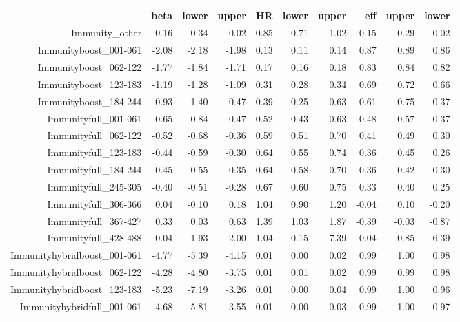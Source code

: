 \begin{table}[ht]
\centering
\begin{tabular}{rrrrrrrrrr}
  \hline
 & beta & lower & upper & HR & lower & upper & eff & upper & lower \\ 
  \hline
Immunity\_other & -0.16 & -0.34 & 0.02 & 0.85 & 0.71 & 1.02 & 0.15 & 0.29 & -0.02 \\ 
  Immunityboost\_001-061 & -2.08 & -2.18 & -1.98 & 0.13 & 0.11 & 0.14 & 0.87 & 0.89 & 0.86 \\ 
  Immunityboost\_062-122 & -1.77 & -1.84 & -1.71 & 0.17 & 0.16 & 0.18 & 0.83 & 0.84 & 0.82 \\ 
  Immunityboost\_123-183 & -1.19 & -1.28 & -1.09 & 0.31 & 0.28 & 0.34 & 0.69 & 0.72 & 0.66 \\ 
  Immunityboost\_184-244 & -0.93 & -1.40 & -0.47 & 0.39 & 0.25 & 0.63 & 0.61 & 0.75 & 0.37 \\ 
  Immunityfull\_001-061 & -0.65 & -0.84 & -0.47 & 0.52 & 0.43 & 0.63 & 0.48 & 0.57 & 0.37 \\ 
  Immunityfull\_062-122 & -0.52 & -0.68 & -0.36 & 0.59 & 0.51 & 0.70 & 0.41 & 0.49 & 0.30 \\ 
  Immunityfull\_123-183 & -0.44 & -0.59 & -0.30 & 0.64 & 0.55 & 0.74 & 0.36 & 0.45 & 0.26 \\ 
  Immunityfull\_184-244 & -0.45 & -0.55 & -0.35 & 0.64 & 0.58 & 0.70 & 0.36 & 0.42 & 0.30 \\ 
  Immunityfull\_245-305 & -0.40 & -0.51 & -0.28 & 0.67 & 0.60 & 0.75 & 0.33 & 0.40 & 0.25 \\ 
  Immunityfull\_306-366 & 0.04 & -0.10 & 0.18 & 1.04 & 0.90 & 1.20 & -0.04 & 0.10 & -0.20 \\ 
  Immunityfull\_367-427 & 0.33 & 0.03 & 0.63 & 1.39 & 1.03 & 1.87 & -0.39 & -0.03 & -0.87 \\ 
  Immunityfull\_428-488 & 0.04 & -1.93 & 2.00 & 1.04 & 0.15 & 7.39 & -0.04 & 0.85 & -6.39 \\ 
  Immunityhybridboost\_001-061 & -4.77 & -5.39 & -4.15 & 0.01 & 0.00 & 0.02 & 0.99 & 1.00 & 0.98 \\ 
  Immunityhybridboost\_062-122 & -4.28 & -4.80 & -3.75 & 0.01 & 0.01 & 0.02 & 0.99 & 0.99 & 0.98 \\ 
  Immunityhybridboost\_123-183 & -5.23 & -7.19 & -3.26 & 0.01 & 0.00 & 0.04 & 0.99 & 1.00 & 0.96 \\ 
  Immunityhybridfull\_001-061 & -4.68 & -5.81 & -3.55 & 0.01 & 0.00 & 0.03 & 0.99 & 1.00 & 0.97 \\ 

\end{tabular}
\end{table}
